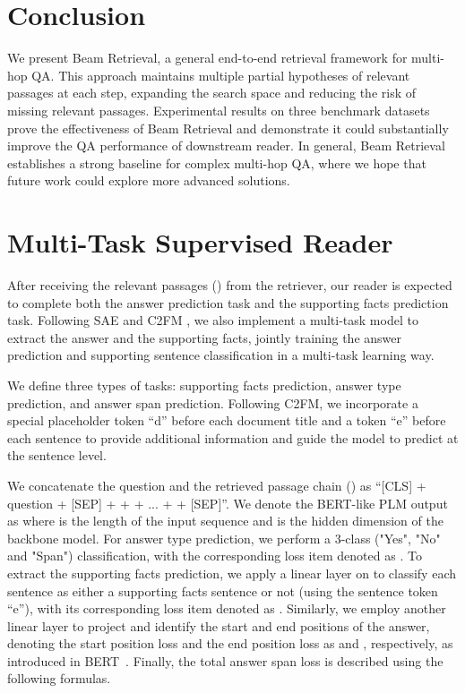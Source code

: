 \documentclass[10.5pt]{article}
\begin{document}
\section{Conclusion}
We present Beam Retrieval, a general end-to-end retrieval framework for multi-hop QA. This approach maintains multiple partial hypotheses of relevant passages at each step, expanding the search space and reducing the risk of missing relevant passages. Experimental results on three benchmark datasets prove the effectiveness of Beam Retrieval and demonstrate it could substantially improve the QA performance of downstream reader. In general, Beam Retrieval establishes a strong baseline for complex multi-hop QA, where we hope that future work could explore more advanced solutions. 



\newpage
\appendix

\section{Multi-Task Supervised Reader}\label{appendix_a}
After receiving the relevant passages () from the retriever, our reader is expected to complete both the answer prediction task and the supporting facts prediction task. Following SAE \cite{DBLP:conf/aaai/TuHW0HZ20} and C2FM \cite{DBLP:journals/corr/abs-2212-09512}, we also implement a multi-task model to extract the answer and the supporting facts, jointly training the answer prediction and supporting sentence classification in a multi-task learning way.

We define three types of tasks: supporting facts prediction, answer type prediction, and answer span prediction. Following C2FM, we incorporate a special placeholder token ``d'' before each document title and a token ``e'' before each sentence to provide additional information and guide the model to predict at the sentence level.

We concatenate the question and the retrieved passage chain () as ``[CLS] + question + [SEP] +  +   + ... +  + [SEP]''. We denote the BERT-like PLM output as  where  is the length of the input sequence and  is the hidden dimension of the backbone model. For answer type prediction, we perform a 3-class ("Yes", "No" and "Span") classification, with the corresponding loss item denoted as  . To extract the supporting facts prediction, we apply a linear layer on  to classify each sentence as either a supporting facts sentence or not (using the sentence token ``e''), with its corresponding loss item denoted as . Similarly, we employ another linear layer to project  and identify the start and end positions of the answer, denoting the start position loss and the end position loss as  and , respectively, as introduced in BERT~\cite{devlin-etal-2019-bert}. Finally, the total answer span loss  is described using the following formulas.
\end{document}
